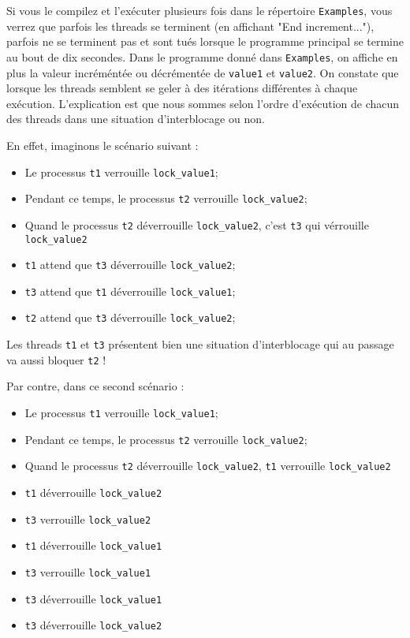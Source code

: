 \documentclass[fleqn,11pt]{article}
\begin{document}
Si vous le compilez et l'exécuter plusieurs fois dans le répertoire \texttt{Examples}, vous verrez que
parfois les threads se terminent (en affichant "End increment..."), parfois ne se terminent pas et
sont tués lorsque le programme principal se termine au bout de dix secondes. Dans le programme donné
dans \texttt{Examples}, on affiche en plus la valeur incréméntée ou décrémentée de \texttt{value1}
et \texttt{value2}. On constate que lorsque les threads semblent se geler à des itérations différentes
à chaque exécution.
L'explication est que nous sommes selon l'ordre d'exécution de chacun des threads dans une situation d'interblocage ou non. 

En effet, imaginons le scénario suivant :
\begin{itemize}
  \item Le processus \texttt{t1} verrouille \texttt{lock\_value1};
  \item Pendant ce temps, le processus \texttt{t2} verrouille \texttt{lock\_value2};
  \item Quand le processus \texttt{t2} déverrouille \texttt{lock\_value2}, c'est \texttt{t3} qui
        vérrouille \texttt{lock\_value2}
  \item \texttt{t1} attend que \texttt{t3} déverrouille \texttt{lock\_value2};
  \item \texttt{t3} attend que \texttt{t1} déverrouille \texttt{lock\_value1};
  \item \texttt{t2} attend que \texttt{t3} déverrouille \texttt{lock\_value2};
\end{itemize}

Les threads \texttt{t1} et \texttt{t3} présentent bien une situation d'interblocage qui au passage
va aussi bloquer \texttt{t2} ! 

Par contre, dans ce second scénario :
\begin{itemize}
  \item Le processus \texttt{t1} verrouille \texttt{lock\_value1};
  \item Pendant ce temps, le processus \texttt{t2} verrouille \texttt{lock\_value2};
  \item Quand le processus \texttt{t2} déverrouille \texttt{lock\_value2}, \texttt{t1}
        verrouille \texttt{lock\_value2}
  \item \texttt{t1} déverrouille \texttt{lock\_value2}
  \item \texttt{t3} verrouille \texttt{lock\_value2}
  \item \texttt{t1} déverrouille \texttt{lock\_value1}
  \item \texttt{t3} verrouille \texttt{lock\_value1}
  \item \texttt{t3} déverrouille \texttt{lock\_value1}
  \item \texttt{t3} déverrouille \texttt{lock\_value2}
\end{itemize}
\end{document}
